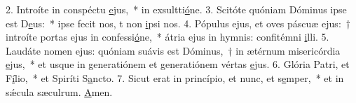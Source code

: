 2. Introíte in conspéctu \uline{e}jus,~* in exsultti\uline{ó}ne.
3. Scitóte quóniam Dóminus ipse est D\uline{e}us:~* ipse fecit nos, t non \uline{i}psi nos.
4. Pópulus ejus, et oves páscuæ ejus:~† introíte portas ejus in confessi\uline{ó}ne,~* átria ejus in hymnis: confitémni \uline{i}lli.
5. Laudáte nomen ejus: quóniam suávis est Dóminus,~† in ætérnum misericórdia \uline{e}jus,~* et usque in generatiónem et generatiónem vértas \uline{e}jus.
6. Glória Patri, et F\uline{í}lio,~* et Spiríti S\uline{a}ncto.
7. Sicut erat in princípio, et nunc, et s\uline{e}mper,~* et in sǽcula sæculrum. \uline{A}men.
